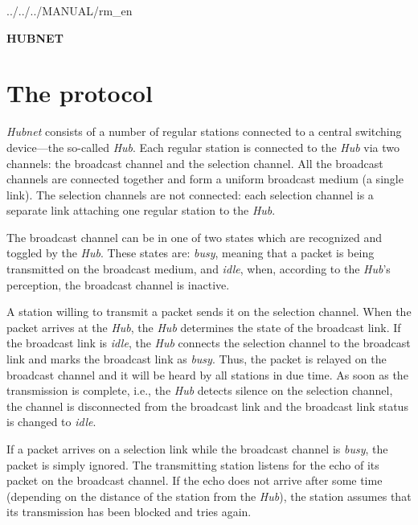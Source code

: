  {../../../MANUAL/rm_en}



\begin{titlepage}

\vspace*{3.5in}
\begin{center}
\Huge\bf HUBNET \vspace{0.25in}
\end{center}
\end{titlepage}

\section{The protocol}

{\em Hubnet\/} consists of a number
of regular stations connected to a central
switching device---the so-called {\em Hub}.
Each regular station is connected to the {\em Hub} via
two channels: the broadcast channel and the selection channel.
All the broadcast channels are connected
together and form a uniform broadcast medium (a single link).
The selection channels are
not connected: each selection channel is a separate link attaching one
regular station to the {\em Hub}.

The broadcast channel can be in one of two states which are recognized and
toggled by the {\em Hub}.
These states are: {\em busy\/}, meaning that a packet is being transmitted
on the broadcast medium, and {\em idle\/}, when, according to the {\em Hub}'s
perception, the broadcast channel is inactive.

A station willing to
transmit a packet sends it on the selection channel.
When the packet arrives at the {\em Hub},
the {\em Hub} determines the state of the broadcast link.
If the broadcast link
is {\em idle}, the {\em Hub} connects the selection channel
to the broadcast link and marks the broadcast link as {\em busy}.
Thus, the packet is relayed on the
broadcast channel and it will be heard by all stations in due time.
As soon as the transmission is complete, i.e., 
the {\em Hub} detects silence on the selection channel,
the channel is disconnected from the broadcast link and
the broadcast link status is changed to {\em idle}.

If a packet arrives on a selection link while the broadcast channel is
{\em busy}, the packet is simply ignored.
The transmitting
station listens for the echo of its packet on the broadcast channel.
If the echo does not arrive after some time (depending on the distance
of the station from the {\em Hub}), the station assumes that its transmission
has been blocked and tries again.

